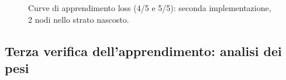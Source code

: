 \documentclass[a4paper,12pt]{article}
\begin{document}
\begin{figure}[htp]
    \centering

    \medskip


    \caption{Curve di apprendimento loss (4/5 e 5/5): seconda implementazione, 2 nodi nello strato nascosto.}
    \label{fig4-3}
\end{figure}



\newpage
\subsection{Terza verifica dell'apprendimento: analisi dei pesi}
\end{document}
